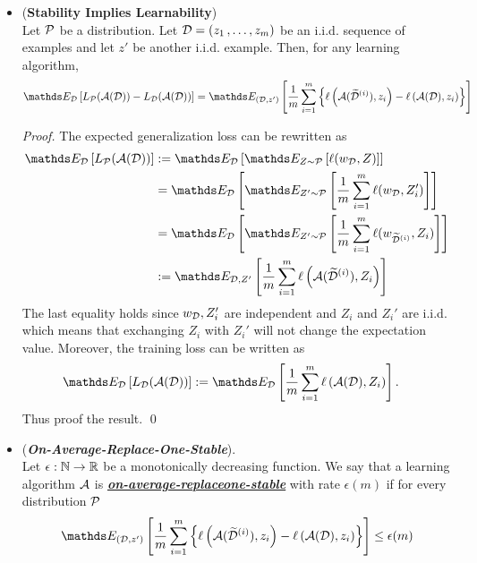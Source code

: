\documentclass[11pt]{article}
\begin{document}
\begin{itemize}
\item \begin{theorem}\label{thm: stability_learnability} (\textbf{Stability Implies Learnability}) \citep{shalev2014understanding} \\
Let ${\mathcal P}$ be a distribution. Let ${\mathcal D} = (z_1 \,{,}\ldots{,}\, z_m)$ be an i.i.d. sequence of examples and let $z'$ be another i.i.d. example. Then, for any learning algorithm,
\begin{align}
\E{\cD}{L_{\cP}(\cA(\cD)) - L_{\cD}(\cA(\cD)) } = \E{(\cD, z')}{\frac{1}{m}\sum_{i=1}^{m}\set{\ell\paren{\cA(\widetilde{\cD}^{(i)}), z_i} - \ell\paren{\cA(\cD), z_i}}} \label{prop: stable_alg}
\end{align}
\end{theorem}
\begin{proof}
The expected generalization loss can be rewritten as
\begin{align*}
\E{\cD}{L_{\cP}(\cA(\cD))} &:= \E{\cD}{\E{Z \sim \cP}{\ell(w_{\cD}, Z)}}\\
&= \E{\cD}{\E{Z' \sim \cP}{\frac{1}{m}\sum_{i=1}^{m}\ell(w_{\cD}, Z_i')}}\\
&= \E{\cD}{\E{Z' \sim \cP}{\frac{1}{m}\sum_{i=1}^{m}\ell(w_{\widetilde{\cD}^{(i)}}, Z_i)}}\\
&:= \E{\cD, Z'}{\frac{1}{m}\sum_{i=1}^{m}\ell\paren{\cA(\widetilde{\cD}^{(i)}), Z_i}}
\end{align*} The last equality holds since $w_{{\mathcal D}}, Z_i'$ are independent and $Z_i$ and $Z_{i}'$ are i.i.d. which means that exchanging $Z_i$ with $Z_{i}'$ will not change the expectation value. Moreover, the training loss can be written as
\begin{align*}
\E{\cD}{L_{\cD}(\cA(\cD))} &:= \E{\cD}{\frac{1}{m}\sum_{i=1}^{m} \ell\paren{\cA(\cD), Z_i}}.
\end{align*} Thus proof the result. \qed
\end{proof}

\item \begin{definition}(\textbf{\emph{On-Average-Replace-One-Stable}}).  \citep{shalev2014understanding} \\
Let $\epsilon: {\mathbb N} \to {\mathbb R}$ be a monotonically decreasing function. We say that a learning algorithm ${\mathcal A}$ is \underline{\textbf{\emph{on-average-replaceone-stable}}} with rate $\epsilon(m)$ if for every distribution ${\mathcal P}$
\begin{align}
 \E{(\cD, z')}{\frac{1}{m}\sum_{i=1}^{m}\set{\ell\paren{\cA(\widetilde{\cD}^{(i)}), z_i} - \ell\paren{\cA(\cD), z_i}}} \le \epsilon(m) \label{def: stable_alg_epsilon}
\end{align}
\end{definition}
\end{itemize}
\end{document}
